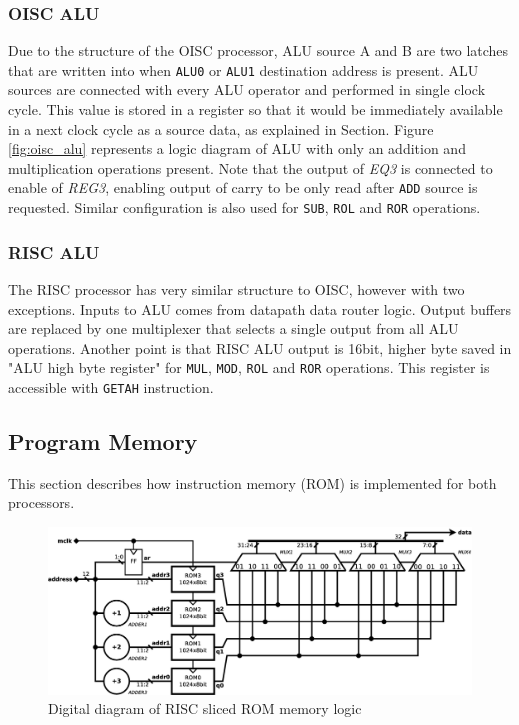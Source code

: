 \subsubsection{OISC ALU}
Due to the structure of the OISC processor, ALU source A and B are two latches that are written into when \texttt{ALU0} or \texttt{ALU1} destination address is present. ALU sources are connected with every ALU operator and performed in single clock cycle. This value is stored in a register so that it would be immediately available in a next clock cycle as a source data, as explained in  Section. Figure \ref{fig:oisc_alu} represents a logic diagram of ALU with only an addition and multiplication operations present. Note that the output of \textit{EQ3} is connected to enable of \textit{REG3}, enabling output of carry to be only read after \texttt{ADD} source is requested. Similar configuration is also used for \texttt{SUB}, \texttt{ROL} and \texttt{ROR} operations.

\subsubsection{RISC ALU}
The RISC processor has very similar structure to OISC, however with two exceptions. Inputs to ALU comes from datapath data router logic. Output buffers are replaced by one multiplexer that selects a single output from all ALU operations. Another point is that RISC ALU output is 16bit, higher byte saved in "ALU high byte register" for \texttt{MUL}, \texttt{MOD}, \texttt{ROL} and \texttt{ROR} operations. This register is accessible with \texttt{GETAH} instruction.

\subsection{Program Memory}\label{subsec:memory}
This section describes how instruction memory (ROM) is implemented for both processors.

\begin{figure}[b]
	\centering
	\includegraphics[width=\linewidth]{../resources/risc_mem.eps}
	\caption{Digital diagram of RISC sliced ROM memory logic}
	\label{fig:risc_mem}
\end{figure}

